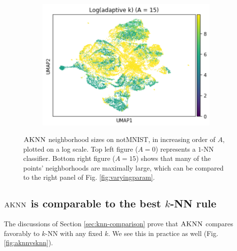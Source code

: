 \documentclass{article}
\newcommand{\algname}{\textsc{AKNN}}
\begin{document}
\begin{figure}
\begin{subfigure}[t]{0.32\textwidth}
        \includegraphics[width=\linewidth]{figs/notMNIST/notMNIST_logadaK_Aeq15.png} %
    \end{subfigure}
    \hfill
  \caption{$\algname$ neighborhood sizes on notMNIST, in increasing order of $A$, plotted on a log scale. Top left figure ($A = 0$) represents a $1$-NN classifier. Bottom right figure ($A = 15$) shows that many of the points' neighborhoods are maximally large, which can be compared to the right panel of Fig. \ref{fig:varyingparam}.}
  \label{fig:varyingadak}
\end{figure}


\subsection{$\algname$ is comparable to the best $k$-NN rule}

The discussions of Section \ref{sec:knn-comparison} prove that $\algname$ compares favorably to $k$-NN with any fixed $k$. We see this in practice as well (Fig. \ref{fig:aknnvsknn}). 
\end{document}
